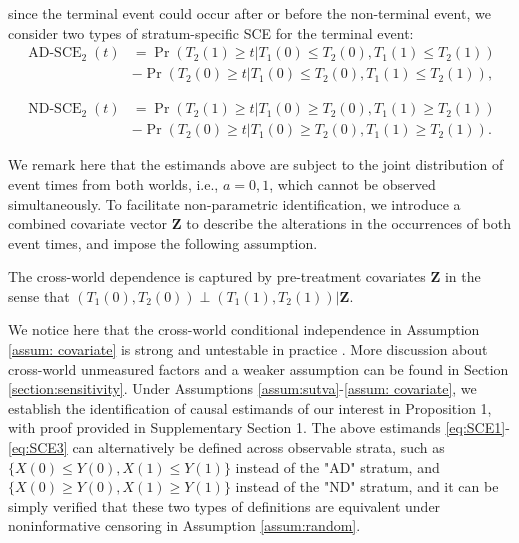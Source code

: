 \documentclass[APA,Times1COL]{WileyNJDv5} %
\theoremstyle{plain}
\def\bfZ{\mathbf{Z}}
\def\Pr{\operatorname{Pr}}
\begin{document}
since the terminal event could occur after or before the non-terminal event, 
we consider two types of stratum-specific SCE for the terminal event:
\begin{equation}
\begin{split}
\operatorname{AD-SCE}_2(t)
&=\Pr(T_2(1)\geq t|T_1(0)\leq T_2(0),T_1(1)\leq T_2(1))\\
&-\Pr(T_2(0)\geq t|T_1(0)\leq T_2(0),T_1(1)\leq T_2(1)),
\label{eq:SCE2}
\end{split}
\end{equation}

\begin{equation}
\begin{split}
\operatorname{ND-SCE}_2(t)
&=\Pr(T_2(1)\geq t|T_1(0)\geq T_2(0),T_1(1)\geq T_2(1))\\
&-\Pr(T_2(0)\geq t|T_1(0)\geq T_2(0),T_1(1)\geq T_2(1)).
\label{eq:SCE3}
\end{split}
\end{equation}


We remark here that the estimands above are subject to the joint distribution of event times from both worlds, i.e., $a=0,1$, which cannot be observed simultaneously. To facilitate non-parametric identification, we introduce a combined covariate vector $\bfZ$ to describe the alterations in the occurrences of both event times, and impose the following assumption. 
\begin{assumption}
The cross-world dependence is captured by pre-treatment covariates $\bfZ$ in the sense that $(T_1(0),T_2(0))\perp (T_1(1),T_2(1))|\bfZ$.
\label{assum: covariate}
\end{assumption}


We notice here that the cross-world conditional independence in Assumption \ref{assum: covariate} is strong and untestable in practice \citep{richardson2013single,robins2022interventionist,stensrud2021discussion}.
More discussion about cross-world unmeasured factors and a weaker assumption can be found in Section \ref{section:sensitivity}. Under Assumptions \ref{assum:sutva}-\ref{assum: covariate}, we establish the identification of causal estimands of our interest in Proposition 1, with proof provided in Supplementary Section 1. The above estimands \eqref{eq:SCE1}-\eqref{eq:SCE3} can alternatively be defined across observable strata, such as $\{X(0) \leq Y(0), X(1) \leq Y(1)\}$ instead of the "AD" stratum, and $\{X(0) \geq Y(0), X(1) \geq Y(1)\}$ instead of the "ND" stratum, and it can be simply verified that these two types of definitions are equivalent under noninformative censoring in Assumption \ref{assum:random}.
\end{document}
